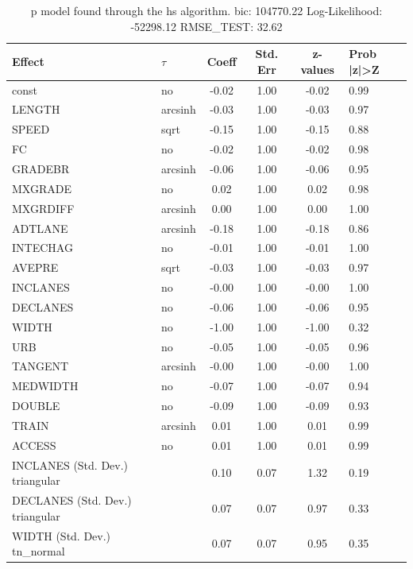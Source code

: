 \begin{table}
	\caption{p model found through the hs algorithm. bic: 104770.22 Log-Likelihood: -52298.12 RMSE_TEST: 32.62}
	\begin{center}
		\begin{tabular}{|l|l|c|c|c|l|}
			\hline
			Effect & $\tau$ & Coeff & Std. Err & z-values & Prob |z|>Z \\
			\hline
			const & no & -0.02 & 1.00 & -0.02 & 0.99 \\
			\hline
			LENGTH & arcsinh & -0.03 & 1.00 & -0.03 & 0.97 \\
			\hline
			SPEED & sqrt & -0.15 & 1.00 & -0.15 & 0.88 \\
			\hline
			FC & no & -0.02 & 1.00 & -0.02 & 0.98 \\
			\hline
			GRADEBR & arcsinh & -0.06 & 1.00 & -0.06 & 0.95 \\
			\hline
			MXGRADE & no & 0.02 & 1.00 & 0.02 & 0.98 \\
			\hline
			MXGRDIFF & arcsinh & 0.00 & 1.00 & 0.00 & 1.00 \\
			\hline
			ADTLANE & arcsinh & -0.18 & 1.00 & -0.18 & 0.86 \\
			\hline
			INTECHAG & no & -0.01 & 1.00 & -0.01 & 1.00 \\
			\hline
			AVEPRE & sqrt & -0.03 & 1.00 & -0.03 & 0.97 \\
			\hline
			INCLANES & no & -0.00 & 1.00 & -0.00 & 1.00 \\
			\hline
			DECLANES & no & -0.06 & 1.00 & -0.06 & 0.95 \\
			\hline
			WIDTH & no & -1.00 & 1.00 & -1.00 & 0.32 \\
			\hline
			URB & no & -0.05 & 1.00 & -0.05 & 0.96 \\
			\hline
			TANGENT & arcsinh & -0.00 & 1.00 & -0.00 & 1.00 \\
			\hline
			MEDWIDTH & no & -0.07 & 1.00 & -0.07 & 0.94 \\
			\hline
			DOUBLE & no & -0.09 & 1.00 & -0.09 & 0.93 \\
			\hline
			TRAIN & arcsinh & 0.01 & 1.00 & 0.01 & 0.99 \\
			\hline
			ACCESS & no & 0.01 & 1.00 & 0.01 & 0.99 \\
			\hline
			INCLANES (Std. Dev.) triangular &  & 0.10 & 0.07 & 1.32 & 0.19 \\
			\hline
			DECLANES (Std. Dev.) triangular &  & 0.07 & 0.07 & 0.97 & 0.33 \\
			\hline
			WIDTH (Std. Dev.) tn_normal &  & 0.07 & 0.07 & 0.95 & 0.35 \\

\end{tabular}
\end{center}
\end{table}

